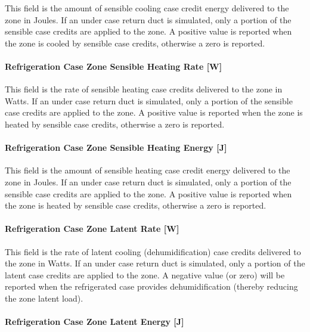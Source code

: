 This field is the amount of sensible cooling case credit energy delivered to the zone in Joules. If an under case return duct is simulated, only a portion of the sensible case credits are applied to the zone. A positive value is reported when the zone is cooled by sensible case credits, otherwise a zero is reported.

\paragraph{Refrigeration Case Zone Sensible Heating Rate {[}W{]}}\label{refrigeration-case-zone-sensible-heating-rate-w}

This field is the rate of sensible heating case credits delivered to the zone in Watts. If an under case return duct is simulated, only a portion of the sensible case credits are applied to the zone. A positive value is reported when the zone is heated by sensible case credits, otherwise a zero is reported.

\paragraph{Refrigeration Case Zone Sensible Heating Energy {[}J{]}}\label{refrigeration-case-zone-sensible-heating-energy-j}

This field is the amount of sensible heating case credit energy delivered to the zone in Joules. If an under case return duct is simulated, only a portion of the sensible case credits are applied to the zone. A positive value is reported when the zone is heated by sensible case credits, otherwise a zero is reported.

\paragraph{Refrigeration Case Zone Latent Rate {[}W{]}}\label{refrigeration-case-zone-latent-rate-w}

This field is the rate of latent cooling (dehumidification) case credits delivered to the zone in Watts. If an under case return duct is simulated, only a portion of the latent case credits are applied to the zone. A negative value (or zero) will be reported when the refrigerated case provides dehumidification (thereby reducing the zone latent load).

\paragraph{Refrigeration Case Zone Latent Energy {[}J{]}}\label{refrigeration-case-zone-latent-energy-j}

